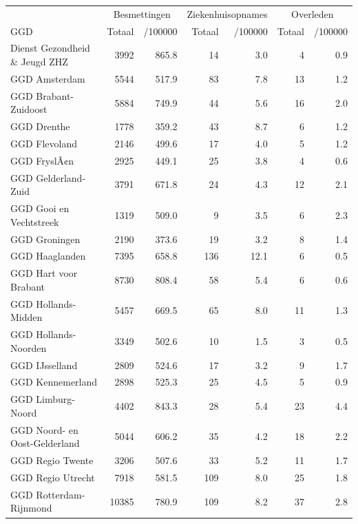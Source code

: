 \documentclass[
  english,
  man,floatsintext]{apa6}
\begin{document}
\begin{table}
\centering\begingroup\fontsize{10}{12}\selectfont

\begin{threeparttable}
\begin{tabular}{lrrrrrr}
\toprule
\multicolumn{1}{c}{ } & \multicolumn{2}{c}{Besmettingen} & \multicolumn{2}{c}{Ziekenhuisopnames} & \multicolumn{2}{c}{Overleden} \\
\cmidrule(l{3pt}r{3pt}){2-3} \cmidrule(l{3pt}r{3pt}){4-5} \cmidrule(l{3pt}r{3pt}){6-7}
GGD & Totaal & /100000 & Totaal & /100000 & Totaal & /100000\\
\midrule
Dienst Gezondheid \& Jeugd ZHZ & 3992 & 865.8 & 14 & 3.0 & 4 & 0.9\\
GGD Amsterdam & 5544 & 517.9 & 83 & 7.8 & 13 & 1.2\\
GGD Brabant-Zuidoost & 5884 & 749.9 & 44 & 5.6 & 16 & 2.0\\
GGD Drenthe & 1778 & 359.2 & 43 & 8.7 & 6 & 1.2\\
GGD Flevoland & 2146 & 499.6 & 17 & 4.0 & 5 & 1.2\\
GGD FryslÃ¢n & 2925 & 449.1 & 25 & 3.8 & 4 & 0.6\\
GGD Gelderland-Zuid & 3791 & 671.8 & 24 & 4.3 & 12 & 2.1\\
GGD Gooi en Vechtstreek & 1319 & 509.0 & 9 & 3.5 & 6 & 2.3\\
GGD Groningen & 2190 & 373.6 & 19 & 3.2 & 8 & 1.4\\
GGD Haaglanden & 7395 & 658.8 & 136 & 12.1 & 6 & 0.5\\
GGD Hart voor Brabant & 8730 & 808.4 & 58 & 5.4 & 6 & 0.6\\
GGD Hollands-Midden & 5457 & 669.5 & 65 & 8.0 & 11 & 1.3\\
GGD Hollands-Noorden & 3349 & 502.6 & 10 & 1.5 & 3 & 0.5\\
GGD IJsselland & 2809 & 524.6 & 17 & 3.2 & 9 & 1.7\\
GGD Kennemerland & 2898 & 525.3 & 25 & 4.5 & 5 & 0.9\\
GGD Limburg-Noord & 4402 & 843.3 & 28 & 5.4 & 23 & 4.4\\
GGD Noord- en Oost-Gelderland & 5044 & 606.2 & 35 & 4.2 & 18 & 2.2\\
GGD Regio Twente & 3206 & 507.6 & 33 & 5.2 & 11 & 1.7\\
GGD Regio Utrecht & 7918 & 581.5 & 109 & 8.0 & 25 & 1.8\\
GGD Rotterdam-Rijnmond & 10385 & 780.9 & 109 & 8.2 & 37 & 2.8\\

\end{tabular}
\end{threeparttable}
\end{table}
\end{document}
